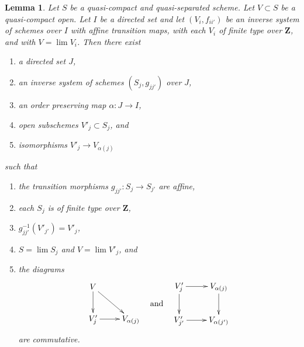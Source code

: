 \documentclass{amsart}
\theoremstyle{plain}
\newtheorem{lemma}[subsection]{Lemma}
\theoremstyle{definition}
\theoremstyle{remark}
\numberwithin{equation}{subsection}
\def\lim{\mathop{\mathrm{lim}}\nolimits}
\begin{document}
\begin{lemma}
\label{limits-lemma-approximate}
Let $S$ be a quasi-compact and quasi-separated scheme. Let $V \subset S$
be a quasi-compact open. Let $I$ be a directed set
and let $(V_i, f_{ii'})$ be an inverse system of schemes over $I$
with affine transition maps, with each $V_i$ of finite type over $\mathbf{Z}$,
and with $V = \lim V_i$. Then there exist
\begin{enumerate}
\item a directed set $J$,
\item an inverse system of schemes $(S_j, g_{jj'})$ over $J$,
\item an order preserving map $\alpha : J \to I$,
\item open subschemes $V'_j \subset S_j$, and
\item isomorphisms $V'_j \to V_{\alpha(j)}$
\end{enumerate}
such that
\begin{enumerate}
\item the transition morphisms $g_{jj'} : S_j \to S_{j'}$ are affine,
\item each $S_j$ is of finite type over $\mathbf{Z}$,
\item $g_{jj'}^{-1}(V'_{j'}) = V'_j$,
\item $S = \lim S_j$ and $V = \lim V'_j$, and
\item the diagrams
$$
\vcenter{
\xymatrix{
V \ar[d] \ar[rd] \\
V'_j \ar[r] & V_{\alpha(j)}
}
}
\quad\text{and}\quad
\vcenter{
\xymatrix{
V'_j \ar[r] \ar[d] & V_{\alpha(j)} \ar[d] \\
V'_{j'} \ar[r] & V_{\alpha(j')}
}
}
$$
are commutative.
\end{enumerate}
\end{lemma}
\end{document}
